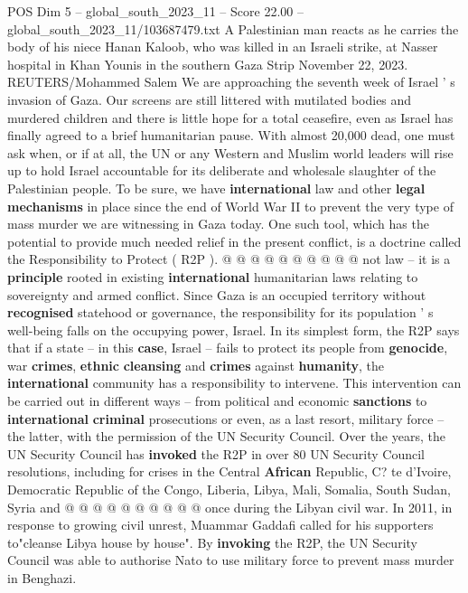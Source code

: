 \begin{textsample}{POS Dim 5 – global\_south\_2023\_11 – Score 22.00 – global\_south\_2023\_11/103687479.txt}  \label{ex:f5_pos_271}
A Palestinian man reacts as he carries the body of his niece Hanan Kaloob, who was killed in an Israeli strike, at Nasser hospital in Khan Younis in the southern Gaza Strip November 22, 2023.
REUTERS/Mohammed Salem We are approaching the seventh week of Israel ' s invasion of Gaza.
Our screens are still littered with mutilated bodies and murdered children and there is little hope for a total ceasefire, even as Israel has finally agreed to a brief humanitarian pause.
With almost 20,000 dead, one must ask when, or if at all, the UN or any Western and Muslim world leaders will rise up to hold Israel accountable for its deliberate and wholesale slaughter of the Palestinian people.
To be sure, we have \textbf{international} law and other \textbf{legal} \textbf{mechanisms} in place since the end of World War II to prevent the very type of mass murder we are witnessing in Gaza today.
One such tool, which has the potential to provide much needed relief in the present conflict, is a doctrine called the Responsibility to Protect ( R2P ). @ @ @ @ @ @ @ @ @ @ not law -- it is a \textbf{principle} rooted in existing \textbf{international} humanitarian laws relating to sovereignty and armed conflict.
Since Gaza is an occupied territory without \textbf{recognised} statehood or governance, the responsibility for its population ' s well-being falls on the occupying power, Israel.
In its simplest form, the R2P says that if a state -- in this \textbf{case}, Israel -- fails to protect its people from \textbf{genocide}, war \textbf{crimes}, \textbf{ethnic} \textbf{cleansing} and \textbf{crimes} against \textbf{humanity}, the \textbf{international} community has a responsibility to intervene.
This intervention can be carried out in different ways -- from political and economic \textbf{sanctions} to \textbf{international} \textbf{criminal} prosecutions or even, as a last resort, military force -- the latter, with the permission of the UN Security Council.
Over the years, the UN Security Council has \textbf{invoked} the R2P in over 80 UN Security Council resolutions, including for crises in the Central \textbf{African} Republic, C? te d'Ivoire, Democratic Republic of the Congo, Liberia, Libya, Mali, Somalia, South Sudan, Syria and @ @ @ @ @ @ @ @ @ @ once during the Libyan civil war.
In 2011, in response to growing civil unrest, Muammar Gaddafi called for his supporters to"cleanse Libya house by house".
By \textbf{invoking} the R2P, the UN Security Council was able to authorise Nato to use military force to prevent mass murder in Benghazi.

\end{textsample}
